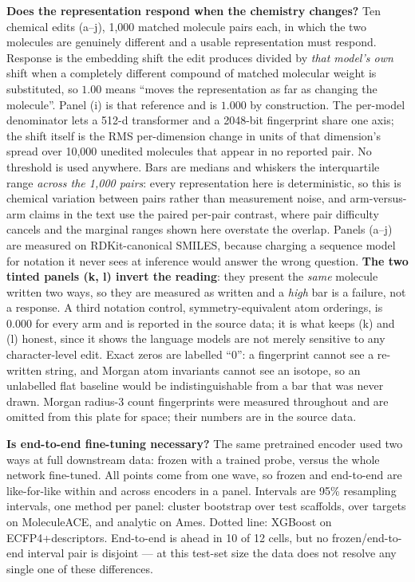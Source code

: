 \caption{\textbf{Does the representation respond when the chemistry changes?}
Ten chemical edits (a--j), 1{,}000 matched molecule pairs each, in which the two molecules are
genuinely different and a usable representation must respond. Response is the embedding shift the
edit produces divided by \emph{that model's own} shift when a completely different compound of
matched molecular weight is substituted, so $1.00$ means ``moves the representation as far as
changing the molecule''. Panel (i) is that reference and is $1.000$ by construction. The
per-model denominator lets a 512-d transformer and a 2048-bit fingerprint share one axis; the
shift itself is the RMS per-dimension change in units of that dimension's spread over 10{,}000
unedited molecules that appear in no reported pair. No threshold is used anywhere.
Bars are medians and whiskers the interquartile range \emph{across the 1{,}000 pairs}: every
representation here is deterministic, so this is chemical variation between pairs rather than
measurement noise, and arm-versus-arm claims in the text use the paired per-pair contrast, where
pair difficulty cancels and the marginal ranges shown here overstate the overlap.
Panels (a--j) are measured on RDKit-canonical SMILES, because charging a sequence model for
notation it never sees at inference would answer the wrong question.
\textbf{The two tinted panels (k, l) invert the reading}: they present the \emph{same} molecule
written two ways, so they are measured as written and a \emph{high} bar is a failure, not a
response. A third notation control, symmetry-equivalent atom orderings, is $0.000$ for every arm
and is reported in the source data; it is what keeps (k) and (l) honest, since it shows the
language models are not merely sensitive to any character-level edit.
Exact zeros are labelled ``0'': a fingerprint cannot see a re-written string, and Morgan atom
invariants cannot see an isotope, so an unlabelled flat baseline would be indistinguishable from
a bar that was never drawn.
Morgan radius-3 count fingerprints were measured throughout and are omitted from this plate for
space; their numbers are in the source data.}

\caption{\textbf{Is end-to-end fine-tuning necessary?}
The same pretrained encoder used two ways at full downstream data: frozen with a trained probe,
versus the whole network fine-tuned. All points come from one wave, so frozen and end-to-end are
like-for-like within and across encoders in a panel. Intervals are 95\% resampling intervals,
one method per panel: cluster bootstrap over test scaffolds, over targets on MoleculeACE, and
analytic on Ames. Dotted line: XGBoost on ECFP4+descriptors.
End-to-end is ahead in 10 of 12 cells, but no frozen/end-to-end interval pair is disjoint --- at
this test-set size the data does not resolve any single one of these differences.}

